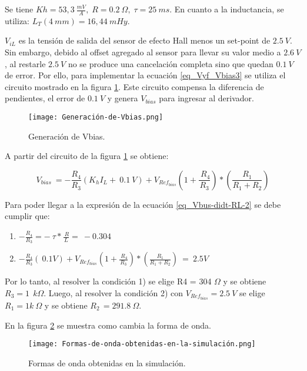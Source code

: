 \noindent Se tiene $Kh = 53,3\:\frac{mV}{A},\; R = 0.2\:\Omega,\; \tau  = 25 \:ms$. En cuanto a la inductancia, se utiliza:  $L_T(4\:mm) = 16,44\:mHy$.

\noindent $V_{iL}$ es la tensi\'{o}n de salida del sensor de efecto Hall menos un set-point de $2.5\:V$. Sin embargo, debido al offset agregado al sensor para llevar su valor medio a $2.6\:V$, al restarle $2.5\:V$ no se produce una cancelaci\'{o}n completa sino que quedan $0.1\:V$ de error. Por ello, para implementar la ecuaci\'{o}n  \ref{eq_Vyf_Vbias3} se utiliza el circuito mostrado en la figura \ref{fig:img_Generación_de_Vbias}. Este circuito compensa la diferencia de pendientes, el error de $0.1\:V$ y genera $V_{bias}$ para ingresar al derivador.

\begin{figure}[H]
	\centering
	\texttt{[image: Generación-de-Vbias.png]}
	\caption{Generación de Vbias.}
	\label{fig:img_Generación_de_Vbias}
\end{figure}

\noindent A partir del circuito de la figura \ref{fig:img_Generación_de_Vbias} se obtiene:

\begin{equation} \label{eq_Vyf-Vbias3}
	V_{bias}\ =-\frac{R_4}{R_3}(K_hI_L+\ 0.1\:V)+V_{Ref_{bias}}(1+\frac{\ R_4}{R_3})*(\frac{R_1}{R_1+R_2})
\end{equation}

\noindent Para poder llegar a la expresi\'{o}n de la ecuaci\'{o}n \ref{eq_Vbus-didt-RL-2} se debe cumplir que:

\begin{enumerate}
	\item  $-\frac{R_4}{R_3}=-\ \tau *\frac{\ R}{L}=\ -0.304$  
	
	\item  $-\frac{R_4}{R_3}(\ 0.1V)+V_{Ref_{bias}}(1+\frac{\ R_4}{R_3})*(\frac{R_1}{R_1+R_2})\ =\ 2.5V$     
\end{enumerate}

\noindent Por lo tanto, al resolver la condici\'{o}n 1) se elige R4 = 304 $\mathit{\Omega}$ y se obtiene $R_3=1\ \:{k\mathit{\Omega}}$. Luego, al resolver la condici\'{o}n 2) con $V_{Ref_{bias}}=2.5\:V$ se elige $R_1=1k\:\mathit{\Omega}$ y se obtiene $R_{2\ }=291.8\:\mathit{\Omega}.$

\noindent En la figura \ref{fig:img_Formas_de_onda_obtenidas_en_la_simulación} se muestra como cambia la forma de onda.

\begin{figure}[H]
	\centering
	\texttt{[image: Formas-de-onda-obtenidas-en-la-simulación.png]}
	\caption{Formas de onda obtenidas en la simulación.}
	\label{fig:img_Formas_de_onda_obtenidas_en_la_simulación}
\end{figure}

